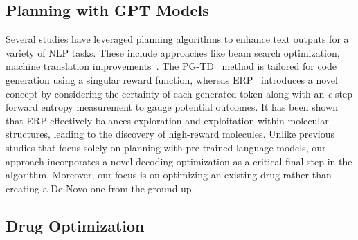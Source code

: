 \subsection{Planning with GPT Models}

Several studies have leveraged planning algorithms to enhance text outputs for a variety of NLP tasks. These include approaches like beam search optimization, machine translation improvements~\citep{scialom2021beam,leblond2021machine,chaffin2021ppl}. The PG-TD~\citep{zhang2023planning} method is tailored for code generation using a singular reward function, whereas ERP~\citep{liu2024erp} introduces a novel concept by considering the certainty of each generated token along with an \emph{e}-step forward entropy measurement to gauge potential outcomes. It has been shown that ERP effectively balances exploration and exploitation within molecular structures, leading to the discovery of high-reward molecules. Unlike previous studies that focus solely on planning with pre-trained language models, our approach incorporates a novel decoding optimization as a critical final step in the algorithm. Moreover, our focus is on optimizing an existing drug rather than creating a De Novo one from the ground up.








\subsection{Drug Optimization}



